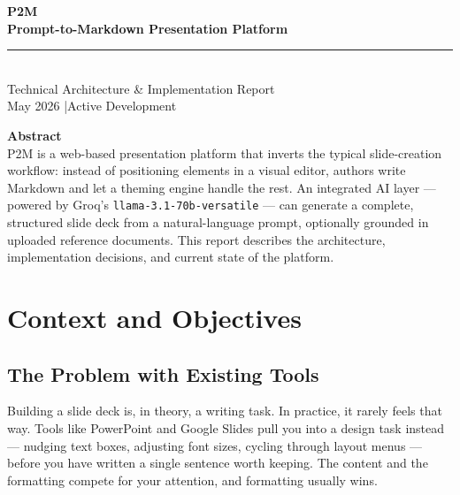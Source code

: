 \documentclass[10pt,a4paper]{article}
\begin{document}
\thispagestyle{empty}
\vspace*{0.8cm}

\begin{flushleft}
  {\fontsize{22}{28}\bfseries P2M}\\[0.3em]
  {\fontsize{13}{16}\bfseries Prompt-to-Markdown Presentation Platform}\\[1em]
  \textcolor{primary}{\rule{6cm}{1.5pt}}\\[1em]
  {\large Technical Architecture \& Implementation Report}\\[0.5em]
  {\normalsize\textcolor{medgray}{May 2026 \quad|\quad Active Development}}
\end{flushleft}

\vspace{1cm}

\begin{mdframed}[backgroundcolor=codebg, linecolor=lightgray, linewidth=1pt, innerleftmargin=14pt, innerrightmargin=14pt, innertopmargin=10pt, innerbottommargin=10pt]
\textbf{Abstract}\\[0.4em]
P2M is a web-based presentation platform that inverts the typical slide-creation workflow: instead of positioning elements in a visual editor, authors write Markdown and let a theming engine handle the rest. An integrated AI layer --- powered by Groq's \texttt{llama-3.1-70b-versatile} --- can generate a complete, structured slide deck from a natural-language prompt, optionally grounded in uploaded reference documents. This report describes the architecture, implementation decisions, and current state of the platform.
\end{mdframed}

\vspace{0.8cm}
\tableofcontents

\newpage

\section{Context and Objectives}

\subsection{The Problem with Existing Tools}

Building a slide deck is, in theory, a writing task. In practice, it rarely feels that way. Tools like PowerPoint and Google Slides pull you into a design task instead --- nudging text boxes, adjusting font sizes, cycling through layout menus --- before you have written a single sentence worth keeping. The content and the formatting compete for your attention, and formatting usually wins.
\end{document}
